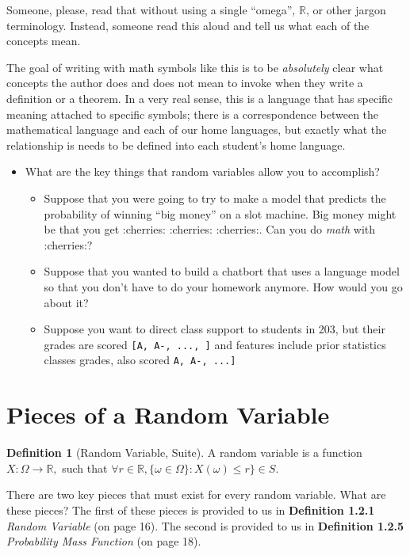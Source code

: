 \documentclass[
]{book}
\providecommand{\tightlist}{%
  \setlength{\itemsep}{0pt}\setlength{\parskip}{0pt}}
\theoremstyle{definition}
\newtheorem{definition}{Definition}[chapter]
\theoremstyle{definition}
\theoremstyle{definition}
\theoremstyle{definition}
\theoremstyle{remark}
\begin{document}
Someone, please, read that without using a single ``omega'', \(\mathbb{R}\), or other jargon terminology. Instead, someone read this aloud and tell us what each of the concepts mean.

The goal of writing with math symbols like this is to be \emph{absolutely} clear what concepts the author does and does not mean to invoke when they write a definition or a theorem. In a very real sense, this is a language that has specific meaning attached to specific symbols; there is a correspondence between the mathematical language and each of our home languages, but exactly what the relationship is needs to be defined into each student's home language.

\begin{itemize}
\tightlist
\item
  What are the key things that random variables allow you to accomplish?

  \begin{itemize}
  \tightlist
  \item
    Suppose that you were going to try to make a model that predicts the probability of winning ``big money'' on a slot machine. Big money might be that you get :cherries: :cherries: :cherries:. Can you do \emph{math} with :cherries:?
  \item
    Suppose that you wanted to build a chatbort that uses a language model so that you don't have to do your homework anymore. How would you go about it?
  \item
    Suppose you want to direct class support to students in 203, but their grades are scored \texttt{{[}A,\ A-,\ ...,\ {]}} and features include prior statistics classes grades, also scored \texttt{A,\ A-,\ ...{]}}
  \end{itemize}
\end{itemize}

\hypertarget{pieces-of-a-random-variable}{%
\section{Pieces of a Random Variable}\label{pieces-of-a-random-variable}}

\begin{definition}[Random Variable, Suite]
A random variable is a function \(X : \Omega \rightarrow \mathbb{R},\) such that \(\forall r \in \mathbb{R}, \{\omega \in \Omega\}: X(\omega) \leq r\} \in S\).
\end{definition}

There are two key pieces that must exist for every random variable. What are these pieces? The first of these pieces is provided to us in \textbf{Definition 1.2.1} \emph{Random Variable} (on page 16). The second is provided to us in \textbf{Definition 1.2.5} \emph{Probability Mass Function} (on page 18).
\end{document}

